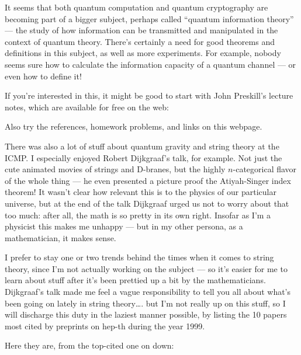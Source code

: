 \documentclass{article}
\def\tightlist{}
\renewcommand{\texttt}[1]{%
  \begingroup
  \ttfamily
  \begingroup\lccode`~=`/\lowercase{\endgroup\def~}{/\discretionary{}{}{}}%
  \begingroup\lccode`~=`[\lowercase{\endgroup\def~}{[\discretionary{}{}{}}%
  \begingroup\lccode`~=`.\lowercase{\endgroup\def~}{.\discretionary{}{}{}}%
  \catcode`/=\active\catcode`[=\active\catcode`.=\active
  \scantokens{#1\noexpand}%
  \endgroup
}
\begin{document}
It seems that both quantum computation and quantum cryptography are
becoming part of a bigger subject, perhaps called ``quantum information
theory'' --- the study of how information can be transmitted and
manipulated in the context of quantum theory. There's certainly a need
for good theorems and definitions in this subject, as well as more
experiments. For example, nobody seems sure how to calculate the
information capacity of a quantum channel --- or even how to define it!

If you're interested in this, it might be good to start with John
Preskill's lecture notes, which are available for free on the web:


Also try the references, homework problems, and links on this webpage.

There was also a lot of stuff about quantum gravity and string theory at
the ICMP. I especially enjoyed Robert Dijkgraaf's talk, for example. Not
just the cute animated movies of strings and D-branes, but the highly
\(n\)-categorical flavor of the whole thing --- he even presented a
picture proof the Atiyah-Singer index theorem! It wasn't clear how
relevant this is to the physics of our particular universe, but at the
end of the talk Dijkgraaf urged us not to worry about that too much:
after all, the math is so pretty in its own right. Insofar as I'm a
physicist this makes me unhappy --- but in my other persona, as a
mathematician, it makes sense.

I prefer to stay one or two trends behind the times when it comes to
string theory, since I'm not actually working on the subject --- so it's
easier for me to learn about stuff after it's been prettied up a bit by
the mathematicians. Dijkgraaf's talk made me feel a vague responsibility
to tell you all about what's been going on lately in string
theory\ldots. but I'm not really up on this stuff, so I will discharge
this duty in the laziest manner possible, by listing the 10 papers most
cited by preprints on hep-th during the year 1999.

Here they are, from the top-cited one on down:
\end{document}
